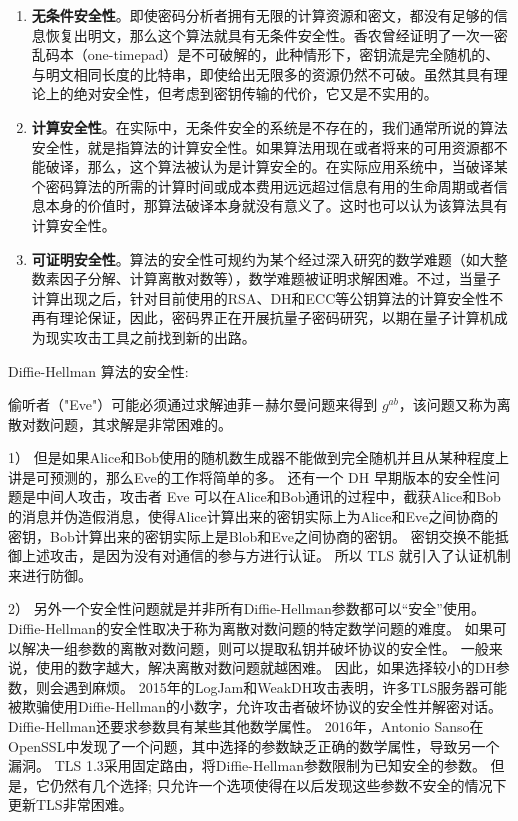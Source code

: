\documentclass[degree=project,degree-type=project,cjk-font=noto]{thuthesis}
\begin{document}
\begin{enumerate}
\begin{enumerate}
  \item \textbf{无条件安全性}。即使密码分析者拥有无限的计算资源和密文，都没有足够的信息恢复出明文，那么这个算法就具有无条件安全性。香农曾经证明了一次一密乱码本（one-timepad）是不可破解的，此种情形下，密钥流是完全随机的、与明文相同长度的比特串，即使给出无限多的资源仍然不可破。虽然其具有理论上的绝对安全性，但考虑到密钥传输的代价，它又是不实用的。
  \item \textbf{计算安全性}。在实际中，无条件安全的系统是不存在的，我们通常所说的算法安全性，就是指算法的计算安全性。如果算法用现在或者将来的可用资源都不能破译，那么，这个算法被认为是计算安全的。在实际应用系统中，当破译某个密码算法的所需的计算时间或成本费用远远超过信息有用的生命周期或者信息本身的价值时，那算法破译本身就没有意义了。这时也可以认为该算法具有计算安全性。
  \item \textbf{可证明安全性}。算法的安全性可规约为某个经过深入研究的数学难题（如大整数素因子分解、计算离散对数等），数学难题被证明求解困难。不过，当量子计算出现之后，针对目前使用的RSA、DH和ECC等公钥算法的计算安全性不再有理论保证，因此，密码界正在开展抗量子密码研究，以期在量子计算机成为现实攻击工具之前找到新的出路。
\end{enumerate}


Diffie-Hellman 算法的安全性:

偷听者（"Eve"）可能必须通过求解迪菲－赫尔曼问题来得到 $g^{ab}$，该问题又称为离散对数问题，其求解是非常困难的。

1） 但是如果Alice和Bob使用的随机数生成器不能做到完全随机并且从某种程度上讲是可预测的，那么Eve的工作将简单的多。
还有一个 DH 早期版本的安全性问题是中间人攻击，攻击者 Eve 可以在Alice和Bob通讯的过程中，截获Alice和Bob的消息并伪造假消息，使得Alice计算出来的密钥实际上为Alice和Eve之间协商的密钥，Bob计算出来的密钥实际上是Blob和Eve之间协商的密钥。
密钥交换不能抵御上述攻击，是因为没有对通信的参与方进行认证。
所以 TLS 就引入了认证机制来进行防御。


2） 另外一个安全性问题就是并非所有Diffie-Hellman参数都可以“安全”使用。 Diffie-Hellman的安全性取决于称为离散对数问题的特定数学问题的难度。 如果可以解决一组参数的离散对数问题，则可以提取私钥并破坏协议的安全性。 一般来说，使用的数字越大，解决离散对数问题就越困难。 因此，如果选择较小的DH参数，则会遇到麻烦。
2015年的LogJam和WeakDH攻击表明，许多TLS服务器可能被欺骗使用Diffie-Hellman的小数字，允许攻击者破坏协议的安全性并解密对话。
Diffie-Hellman还要求参数具有某些其他数学属性。 2016年，Antonio Sanso在OpenSSL中发现了一个问题，其中选择的参数缺乏正确的数学属性，导致另一个漏洞。
TLS 1.3采用固定路由，将Diffie-Hellman参数限制为已知安全的参数。 但是，它仍然有几个选择; 只允许一个选项使得在以后发现这些参数不安全的情况下更新TLS非常困难。

\end{enumerate}
\end{document}

